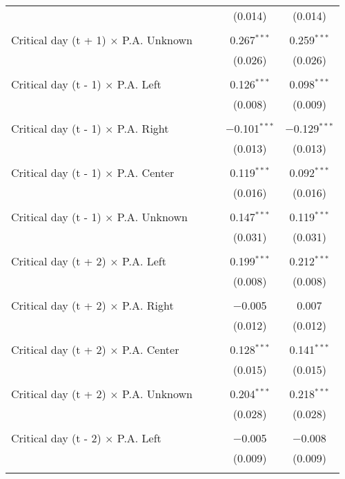 \documentclass[
]{article}
\begin{document}
\begin{table}[!htbp]
{\begin{tabular}{@{\extracolsep{5pt}}lcccc}
  &  &  & (0.014) & (0.014) \\ 
  & & & & \\ 
 Critical day (t + 1) $\times$ P.A. Unknown &  &  & 0.267$^{***}$ & 0.259$^{***}$ \\ 
  &  &  & (0.026) & (0.026) \\ 
  & & & & \\ 
 Critical day (t - 1) $\times$ P.A. Left &  &  & 0.126$^{***}$ & 0.098$^{***}$ \\ 
  &  &  & (0.008) & (0.009) \\ 
  & & & & \\ 
 Critical day (t - 1) $\times$ P.A. Right &  &  & $-$0.101$^{***}$ & $-$0.129$^{***}$ \\ 
  &  &  & (0.013) & (0.013) \\ 
  & & & & \\ 
 Critical day (t - 1) $\times$ P.A. Center &  &  & 0.119$^{***}$ & 0.092$^{***}$ \\ 
  &  &  & (0.016) & (0.016) \\ 
  & & & & \\ 
 Critical day (t - 1) $\times$ P.A. Unknown &  &  & 0.147$^{***}$ & 0.119$^{***}$ \\ 
  &  &  & (0.031) & (0.031) \\ 
  & & & & \\ 
 Critical day (t + 2) $\times$ P.A. Left &  &  & 0.199$^{***}$ & 0.212$^{***}$ \\ 
  &  &  & (0.008) & (0.008) \\ 
  & & & & \\ 
 Critical day (t + 2) $\times$ P.A. Right &  &  & $-$0.005 & 0.007 \\ 
  &  &  & (0.012) & (0.012) \\ 
  & & & & \\ 
 Critical day (t + 2) $\times$ P.A. Center &  &  & 0.128$^{***}$ & 0.141$^{***}$ \\ 
  &  &  & (0.015) & (0.015) \\ 
  & & & & \\ 
 Critical day (t + 2) $\times$ P.A. Unknown &  &  & 0.204$^{***}$ & 0.218$^{***}$ \\ 
  &  &  & (0.028) & (0.028) \\ 
  & & & & \\ 
 Critical day (t - 2) $\times$ P.A. Left &  &  & $-$0.005 & $-$0.008 \\ 
  &  &  & (0.009) & (0.009) \\ 
  & & & & \\ 

\end{tabular}}
\end{table}
\end{document}
